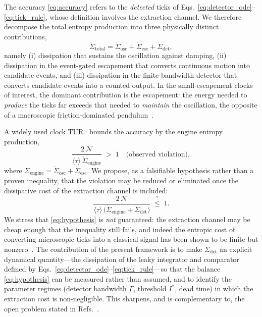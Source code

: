 \documentclass[aps,pre,reprint,amsmath,amssymb,floatfix,nofootinbib]{revtex4-2}
\newcommand{\avg}[1]{\langle #1 \rangle}
\newcommand{\Sdot}{\dot{\Sigma}}
\begin{document}
The accuracy \eqref{eq:accuracy} refers to the \emph{detected} ticks of
Eqs.~\eqref{eq:detector_ode}--\eqref{eq:tick_rule}, whose definition involves the extraction
channel. We therefore decompose the total entropy production into three
physically distinct contributions,
\begin{equation}
  \Sdot_{\mathrm{total}}
  = \Sdot_{\mathrm{osc}} + \Sdot_{\mathrm{esc}} + \Sdot_{\mathrm{det}},
  \label{eq:sigma_total}
\end{equation}
namely (i) dissipation that sustains the oscillation against damping,
(ii) dissipation in the event-gated escapement that converts continuous
motion into candidate events, and (iii) dissipation in the
finite-bandwidth detector that converts candidate events into a counted
output. In the small-escapement clocks of interest, the dominant
contribution is the escapement: the energy needed to \emph{produce} the
ticks far exceeds that needed to \emph{maintain} the oscillation, the
opposite of a macroscopic friction-dominated pendulum~\cite{Brunelli2026}.

A widely used clock TUR~\cite{Culhane2024,Meier2025} bounds the accuracy
by the engine entropy production,
\begin{equation}
  \frac{2\,\mathcal{N}}{\avg{\tau}\,\Sdot_{\mathrm{engine}}} \;>\; 1
  \quad\text{(observed violation)} ,
  \label{eq:viol}
\end{equation}
where $\Sdot_{\mathrm{engine}}=\Sdot_{\mathrm{osc}}+\Sdot_{\mathrm{esc}}$.
We propose, as a falsifiable hypothesis rather than a proven inequality,
that the violation may be reduced or eliminated once the dissipative cost
of the extraction channel is included:
\begin{equation}
  \frac{2\,\mathcal{N}}
       {\avg{\tau}\,\big(\Sdot_{\mathrm{engine}}+\Sdot_{\mathrm{det}}\big)}
  \;\overset{?}{\le}\; 1 .
  \label{eq:hypothesis}
\end{equation}
We stress that \eqref{eq:hypothesis} is \emph{not} guaranteed: the
extraction channel may be cheap enough that the inequality still fails,
and indeed the entropic cost of converting microscopic ticks into a
classical signal has been shown to be finite but
nonzero~\cite{Wadhia2025}. The contribution of the present framework is
to make $\Sdot_{\mathrm{det}}$ an explicit dynamical quantity---the
dissipation of the leaky integrator and comparator defined by
Eqs.~\eqref{eq:detector_ode}--\eqref{eq:tick_rule}---so that the balance \eqref{eq:hypothesis} can
be measured rather than assumed, and to identify the parameter regimes
(detector bandwidth $\Gamma$, threshold $I^\ast$, dead time) in which the
extraction cost is non-negligible. This sharpens, and is complementary
to, the open problem stated in Refs.~\cite{Brunelli2026,Wadhia2025}.
\end{document}
